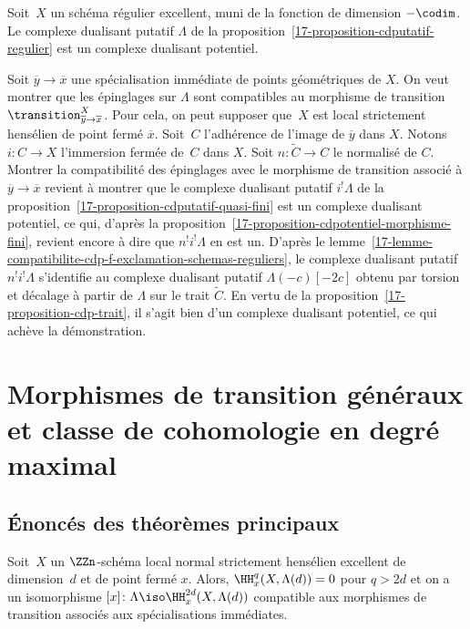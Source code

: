 \documentclass[10pt]{../fichiers-configuration-latex/smfart}
\begin{document}
\begin{proposition3}\label{17-proposition-cdpotentiel-regulier}
Soit $X$ un schéma régulier excellent, muni de la fonction de dimension
$-\codim$. Le complexe dualisant putatif $\Lambda$ de la
proposition~\ref{17-proposition-cdputatif-regulier} est un complexe dualisant
potentiel.
\end{proposition3}

Soit $\overline y\to\overline x$ une spécialisation immédiate de points
géométriques de $X$. On veut montrer que les épinglages sur $\Lambda$ sont
compatibles au morphisme de transition $\transition^X_{\overline y\to\overline
x}$. Pour cela, on peut supposer que $X$ est local strictement hensélien de
point fermé $\overline x$. Soit $C$ l'adhérence de l'image de $\overline
y$ dans $X$. Notons $i\colon C\to X$ l'immersion fermée de $C$ dans $X$.
Soit $n\colon \tilde C\to C$ le normalisé de $C$. Montrer la compatibilité
des épinglages avec le morphisme de transition associé à $\overline y\to
\overline x$ revient à montrer que le complexe dualisant putatif
$i^!\Lambda$ de la proposition~\ref{17-proposition-cdputatif-quasi-fini} est
un complexe dualisant potentiel, ce qui, d'après la
proposition~\ref{17-proposition-cdpotentiel-morphisme-fini},
revient encore à dire que
$n^!i^!\Lambda$ en est un. D'après le 
lemme~\ref{17-lemme-compatibilite-cdp-f-exclamation-schemas-reguliers},
le complexe dualisant
putatif $n^!i^!\Lambda$ s'identifie au complexe dualisant putatif
$\Lambda(-c)[-2c]$ obtenu par torsion et décalage à partir de $\Lambda$ sur
le trait $\tilde C$. En vertu de la
proposition~\ref{17-proposition-cdp-trait}, il s'agit bien d'un complexe
dualisant potentiel, ce qui achève la démonstration.

\section{Morphismes de transition généraux et classe de cohomologie en degré maximal}%
\label{17-section-classe-de-cohomologie}
\subsection{Énoncés des théorèmes principaux}%

\begin{theoreme2}\label{17-theoreme-classe-degre-maximal}
Soit $X$ un $\ZZn$-schéma local normal strictement 
hensélien excellent de dimension $d$ et de point fermé $x$.
Alors, $\HH^q_x(X,\Lambda(d))=0$ pour $q>2d$ et on a un isomorphisme 
$[x]\colon \Lambda\iso \HH^{2d}_x(X,\Lambda(d))$
compatible aux morphismes de transition associés aux spécialisations
immédiates.
\end{theoreme2}
\end{document}
